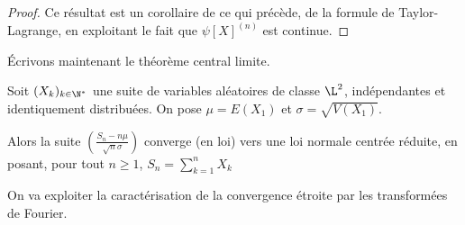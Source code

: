 \begin{proof}
Ce résultat est un corollaire de ce qui précède, de la formule de Taylor-Lagrange, en exploitant le fait que $\psi[X]^{(n)}$ est continue.
\end{proof}

Écrivons maintenant le théorème central limite.

\begin{theo}
Soit $(X_k)_{k \in \N^*}$ une suite de variables aléatoires de classe $\L^2$, indépendantes et identiquement distribuées. On pose $\mu = E(X_1)$ et $\sigma = \sqrt{V(X_1)}$.

\medskip
Alors la suite $\left ( \frac{S_n - n \mu}{\sqrt{n} \sigma}\right )$ converge (en loi) vers une loi normale centrée réduite, en posant, pour tout $n \geq 1$, $S_n = \displaystyle{\sum_{k=1}^n} X_k$
\end{theo}

On va exploiter la caractérisation de la convergence étroite par les transformées de Fourier.

